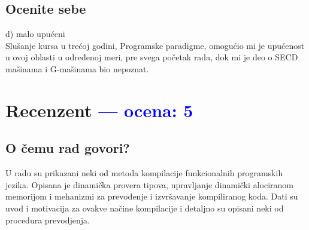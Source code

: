 \documentclass[a4paper]{report}
\newcommand{\odgovor}[1]{\textcolor{blue}{#1}}
\begin{document}
\section{Ocenite sebe}
 d) malo upućeni  \\ 
Slušanje kursa u trećoj godini, Programske paradigme, omogućio mi je upućenost u ovoj oblasti u određenoj meri, pre svega početak rada, dok mi je deo o SECD mašinama i G-mašinama bio nepoznat.


\chapter{Recenzent \odgovor{--- ocena: 5} }


\section{O čemu rad govori?}
U radu su prikazani neki od metoda kompilacije funkcionalnih programskih jezika.
Opisana je dinamička provera tipova, upravljanje dinamički alociranom memorijom i mehanizmi za prevođenje i izvršavanje kompiliranog koda. Dati su uvod i motivacija za ovakve načine kompilacije i detaljno su opisani neki od procedura prevodjenja.
\end{document}
